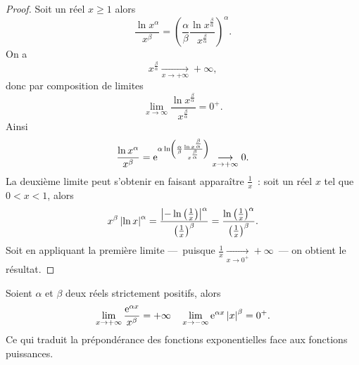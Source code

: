 \begin{proof}
  Soit un réel \(x \geqslant 1\) alors
  \begin{equation}
    \frac{\ln x^\alpha}{x^\beta}=\left(\frac{\alpha}{\beta} \frac{\ln x^{\frac{\beta}{\alpha}}}{x^{\frac{\beta}{\alpha}}} \right)^\alpha.
  \end{equation}
  On a
  \begin{equation}
    x^{\frac{\beta}{\alpha}}\underset{x \to +\infty}{\longrightarrow}+\infty,
  \end{equation}
  donc par composition de limites
  \begin{equation}
    \lim\limits_{x \to \infty} \frac{\ln x^{\frac{\beta}{\alpha}}}{x^{\frac{\beta}{\alpha}}}=0^{+}.
  \end{equation}
  Ainsi
  \begin{equation}
    \frac{\ln x ^\alpha}{x^\beta}=\operatorname{e}^{\alpha \ln \left(\frac{\alpha}{\beta} \frac{\ln x^{\frac{\beta}{\alpha}}}{x^{\frac{\beta}{\alpha}}} \right)} \underset{x \to +\infty}{\longrightarrow}0.
  \end{equation}
  La deuxième limite peut s'obtenir en faisant apparaître \(\frac{1}{x}\)~: soit un réel \(x\) tel que \(0<x<1\), alors
  \begin{equation}
    x^\beta \left\lvert\ln x\right\rvert^\alpha=\frac{\left\lvert-\ln\left(\frac{1}{x}\right)\right\rvert^\alpha}{\left(\frac{1}{x} \right)^\beta}=\frac{\ln\left(\frac{1}{x}\right)^\alpha}{\left(\frac{1}{x}\right)^\beta}.
  \end{equation}
  Soit en appliquant la première limite ---~puisque \(\frac{1}{x}\underset{x \to 0^+}{\longrightarrow}+\infty\)~--- on obtient le résultat.
\end{proof}
%
\begin{prop}
  Soient \(\alpha\) et \(\beta\) deux réels strictement positifs, alors
  \begin{equation}
    \lim\limits_{x \to + \infty} \frac{\operatorname{e}^{\alpha x}}{x^\beta}=+\infty \quad \lim\limits_{x \to -\infty} \operatorname{e}^{\alpha x} \left\lvert x\right\rvert^\beta=0^+.
  \end{equation}
  Ce qui traduit la prépondérance des fonctions exponentielles face aux fonctions puissances.
\end{prop}
%
